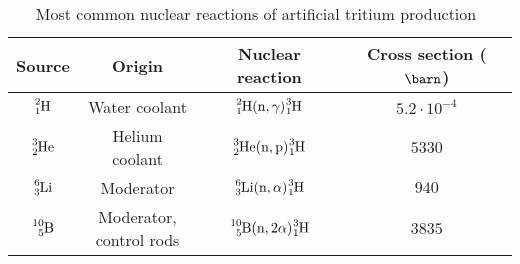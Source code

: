 \begin{table}[htbp]
\begin{center}
\begin{tabular}{|c|c|c|c|}
\hline
Source & Origin & Nuclear reaction & Cross section ($\barn$)\\
\hline \hline \hline
$\ce{^{2}_{1}H}$ & Water coolant & $\ce{^{2}_{1}H}(\ce{n},\gamma)\ce{^{3}_{1}H}$ & $5.2 \cdot{} 10^{-4}$ \\ \hline
$\ce{^{3}_{2}He}$ & Helium coolant & $\ce{^{3}_{2}He}(\ce{n},\ce{p})\ce{^{3}_{1}H}$ & $5330$ \\ \hline
$\ce{^{6}_{3}Li}$ & Moderator & $\ce{^{6}_{3}Li}(\ce{n},\alpha)\ce{^{3}_{1}H}$ & $940$ \\ \hline
$\ce{^{10}_{5}B}$ & \parbox{8em}{\centering Moderator,\\ control rods} & $\ce{^{10}_{5}B}(\ce{n},2\alpha)\ce{^{3}_{1}H}$ & $3835$ \\ 
\hline
\end{tabular}
\caption{Most common nuclear reactions of artificial tritium production~\cite{CommonEmissionTritium}}
\label{tab:NuclearReactionsTritiumProduction}
\end{center}
\end{table}






